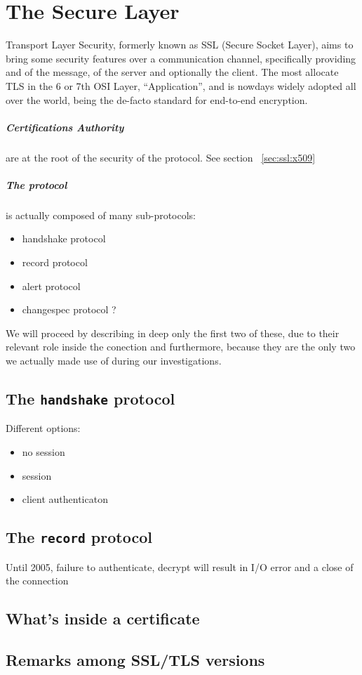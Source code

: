 \chapter{The Secure Layer \label{chap:ssl}}

Transport Layer Security, formerly known as SSL (Secure Socket Layer), aims
to bring some security features over a communication channel, specifically
providing  and  of the message,  of the server and
optionally the client.
The most allocate TLS in the 6 or 7th OSI Layer, ``Application'', and is nowdays widely adopted
all over the world, being the de-facto standard for end-to-end  encryption.

\paragraph{Certifications Authority} are at the root of the security of the
protocol. See section ~\ref{sec:ssl:x509}

\paragraph{The protocol} is actually composed of many sub-protocols:

\begin{itemize}
\item handshake protocol
\item record protocol
\item alert protocol
\item changespec protocol ?
\end{itemize}
We will proceed by describing in deep only the first two of these, due to their
relevant role inside the conection and furthermore, because they are the only
two we actually made use of during our investigations.


\section{The \texttt{handshake} protocol}
Different options:
\begin{itemize}
\item no session
\item session
\item client authenticaton
\end{itemize}


\section{The \texttt{record} protocol}

Until 2005, failure to authenticate, decrypt will result in I/O error and a
close of the connection

\section{What's inside a certificate \label{sec:ssl:x509}}

\section{Remarks among SSL/TLS versions}


